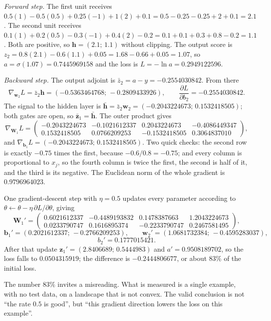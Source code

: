 \emph{Forward step.} The first unit receives
$0.5(1)-0.5(0.5)+0.25(-1)+1(2)+0.1=0.5-0.25-0.25+2+0.1=2.1$.
The second unit receives
$0.1(1)+0.2(0.5)-0.3(-1)+0.4(2)-0.2=0.1+0.1+0.3+0.8-0.2=1.1$.
Both are positive, so $\mathbf{h}=(2.1;\,1.1)$ without clipping. The output score is
$z_{2}=0.8(2.1)-0.6(1.1)+0.05=1.68-0.66+0.05=1.07$, so
$a=\sigma(1.07)=0.7445969158$ and the loss is $L=-\ln a=0.2949122596$.

\emph{Backward step.} The output adjoint is $\bar{z}_{2}=a-y=-0.2554030842$. From there
\[
  \nabla_{\mathbf{w}_{2}}L=\bar{z}_{2}\mathbf{h}
  =(-0.5363464768;\,-0.2809433926),\qquad
  \frac{\partial L}{\partial b_{2}}=-0.2554030842 .
\]
The signal to the hidden layer is
$\bar{\mathbf{h}}=\bar{z}_{2}\mathbf{w}_{2}=(-0.2043224673;\,0.1532418505)$; both gates are
open, so $\bar{\mathbf{z}}_{1}=\bar{\mathbf{h}}$. The outer product gives
\[
  \nabla_{\mathbf{W}_{1}}L=
  \begin{pmatrix}
  -0.2043224673&-0.1021612337&0.2043224673&-0.4086449347\\
  0.1532418505&0.0766209253&-0.1532418505&0.3064837010
  \end{pmatrix},
\]
and $\nabla_{\mathbf{b}_{1}}L=(-0.2043224673;\,0.1532418505)$. Two quick checks: the second row
is exactly $-0.75$ times the first, because $-0.6/0.8=-0.75$; and every column is proportional
to $x_{j}$, so the fourth column is twice the first, the second is half of it, and the third is
its negative. The Euclidean norm of the whole gradient is $0.9796964023$.

One gradient-descent step with $\eta=0.5$ updates every parameter according to
$\theta\leftarrow\theta-\eta\,\partial L/\partial\theta$, giving
\[
  \mathbf{W}_{1}'=\begin{pmatrix}
  0.6021612337&-0.4489193832&0.1478387663&1.2043224673\\
  0.0233790747&0.1616895374&-0.2233790747&0.2467581495
  \end{pmatrix},
\]
\[
  \mathbf{b}_{1}'=(0.2021612337;\,-0.2766209253),\qquad
  \mathbf{w}_{2}'=(1.0681732384;\,-0.4595283037),
\]
\[
  b_{2}'=0.1777015421 .
\]
After that update $\mathbf{z}_{1}'=(2.8406689;\,0.5444983)$ and $a'=0.9508189702$, so the loss
falls to $0.0504315919$; the difference is $-0.2444806677$, or about $83\%$ of the initial loss.

The number $83\%$ invites a misreading. What is measured is a single example, with no test data,
on a landscape that is not convex. The valid conclusion is not ``the rate $0.5$ is good'', but
``this gradient direction lowers the loss on this example''.

